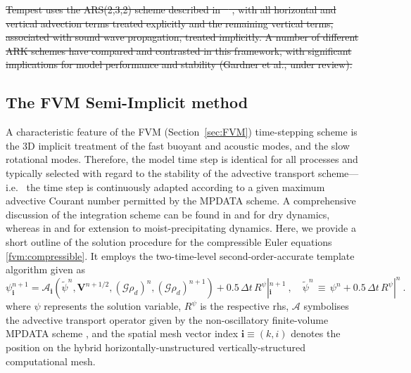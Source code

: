 \documentclass[gmd, manuscript]{copernicus}
\newcommand{\mbf}[1]{{\mathbf #1}}
\newcommand{\scs}[1]{{\scriptstyle #1}}
\providecommand{\DIFdel}[1]{{\protect\color{red}\sout{#1}}}                      %
\providecommand{\DIFdelbegin}{} %
\providecommand{\DIFdelend}{} %
\begin{document}

\DIFdelbegin \DIFdel{Tempest uses the ARS(2,3,2) scheme described in \mbox{%
\cite{ascher1997implicit}}%
, with all horizontal and vertical advection terms treated explicitly and the remaining vertical terms, associated with sound wave propagation, treated implicitly.  A number of different ARK schemes have compared and contrasted in this framework, with significant implications for model performance and stability (Gardner et al., under review).
}%

\DIFdelend \subsection{The FVM Semi-Implicit method} \label{sec:FVMSemiImplicit}

A characteristic feature of the FVM (Section~\ref{sec:FVM}) time-stepping scheme is the 3D implicit treatment 
of the fast buoyant and acoustic modes, and the slow rotational modes. Therefore, the model time step is 
identical for all processes and typically selected with regard to the stability of the advective transport scheme---i.e.~%
the time step is continuously adapted according to a given maximum advective Courant number 
permitted by the MPDATA scheme.
A comprehensive discussion of the integration scheme can be found in \cite{smolarkiewiczJCP2014,smolarkiewiczetalJCP2016}
and \cite{kuehnleinJCP2017} for dry dynamics, 
whereas in \cite{kurowskiJAS2014} and \cite{smolarkiewiczetalJCP2017} for extension to moist-precipitating dynamics.  
Here, we provide a short outline of the solution procedure for the compressible Euler 
equations \eqref{fvm:compressible}. It employs the two-time-level second-order-accurate template algorithm given as
\begin{equation}
\psi_{\mbf{i}}^{n+1}= \mathcal{A}_{\mbf{i}}(\widetilde{\psi}^{n},\mathbf{V}^{n+1/2}, (\mathcal{G}\rho_d)^{n}, (\mathcal{G}\rho_d)^{n+1})
+0.5\,\Delta t\,R^{\psi}|_{\mbf{i}}^{\scs n+1}~,
\hspace{1em} \widetilde{\psi}^{n}\,\equiv\,\psi^n+0.5\,\Delta t\,R^{\psi}|^{\scs n}~.
\label{fvm:solscalar}
\end{equation}
where $\psi$ represents the solution variable, $R^{\psi}$ is the respective rhs,
$\mathcal{A}$ symbolises the advective transport operator given by the non-oscillatory finite-volume 
MPDATA  scheme \citep{smolarkiewiczszmelter2005,kuehnleinJCP2017}, and the spatial mesh vector 
index $\mathbf{i} \equiv (k,i)$ denotes the position on the hybrid horizontally-unstructured 
vertically-structured computational mesh.
\end{document}
